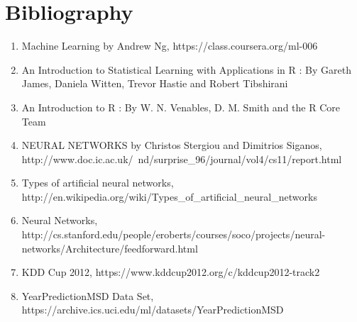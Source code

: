 \documentclass[10pt]{article}
\begin{document}
\section{Bibliography}
\begin{enumerate}
	\item Machine Learning by Andrew Ng, https://class.coursera.org/ml-006
	\item An Introduction to Statistical Learning with Applications in R : By Gareth James, Daniela Witten, Trevor Hastie and Robert Tibshirani
	\item An Introduction to R : By W. N. Venables, D. M. Smith and the R Core Team
	\item NEURAL NETWORKS by Christos Stergiou and Dimitrios Siganos, \\http://www.doc.ic.ac.uk/~nd/surprise\_96/journal/vol4/cs11/report.html
	\item Types of artificial neural networks, http://en.wikipedia.org/wiki/Types\_of\_artificial\_neural\_networks
	\item Neural Networks, \\http://cs.stanford.edu/people/eroberts/courses/soco/projects/neural-networks/Architecture/feedforward.html
	\item KDD Cup 2012, https://www.kddcup2012.org/c/kddcup2012-track2
	\item YearPredictionMSD Data Set, https://archive.ics.uci.edu/ml/datasets/YearPredictionMSD
\end{enumerate}
	

\nocite{*}		

		
\end{document}
